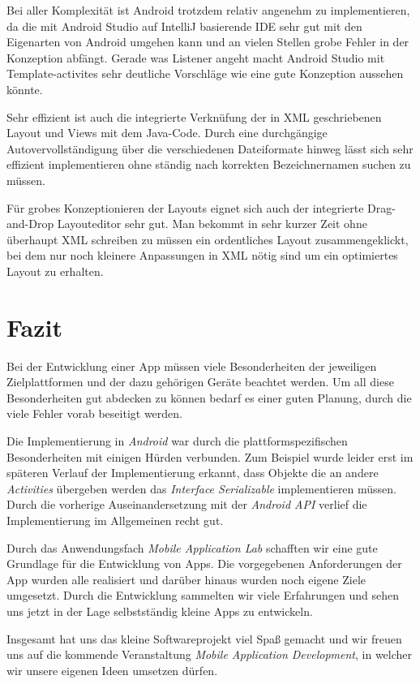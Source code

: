 Bei aller Komplexität ist Android trotzdem relativ angenehm zu implementieren, da die mit Android Studio auf IntelliJ basierende IDE sehr gut mit den Eigenarten von Android umgehen kann und an vielen Stellen grobe Fehler in der Konzeption abfängt. Gerade was Listener angeht macht Android Studio mit  Template-activites sehr deutliche Vorschläge wie eine gute Konzeption aussehen könnte. 

Sehr effizient ist auch die integrierte Verknüfung der in XML geschriebenen Layout und Views mit dem Java-Code. Durch eine durchgängige Autovervollständigung über die verschiedenen Dateiformate hinweg lässt sich sehr effizient implementieren ohne ständig nach korrekten Bezeichnernamen suchen zu müssen.

Für grobes Konzeptionieren der Layouts eignet sich auch der integrierte Drag-and-Drop Layouteditor sehr gut. Man bekommt in sehr kurzer Zeit ohne überhaupt XML schreiben zu müssen ein ordentliches Layout zusammengeklickt, bei dem nur noch kleinere Anpassungen in XML nötig sind um ein optimiertes Layout zu erhalten.

\section{Fazit}
\label{cha:fazit}

Bei der Entwicklung einer App müssen viele Besonderheiten der jeweiligen Zielplattformen und der dazu gehörigen Geräte beachtet werden. Um all diese Besonderheiten gut abdecken zu können bedarf es einer guten Planung, durch die viele Fehler vorab beseitigt werden.

Die Implementierung in \textit{Android} war durch die plattformspezifischen Besonderheiten mit einigen Hürden verbunden. Zum Beispiel wurde leider erst im späteren Verlauf der Implementierung erkannt, dass Objekte die an andere \textit{Activities} übergeben werden das \textit{Interface Serializable} implementieren müssen. Durch die vorherige Auseinandersetzung mit der \textit{Android API} verlief die Implementierung im Allgemeinen recht gut.

Durch das Anwendungsfach \textit{Mobile Application Lab} schafften wir eine gute Grundlage für die Entwicklung von Apps. Die vorgegebenen Anforderungen der App wurden alle realisiert und darüber hinaus wurden noch eigene Ziele umgesetzt. Durch die Entwicklung sammelten wir viele Erfahrungen und sehen uns jetzt in der Lage selbstständig kleine Apps zu entwickeln.

Insgesamt hat uns das kleine Softwareprojekt viel Spaß gemacht und wir freuen uns auf die kommende Veranstaltung \textit{Mobile Application Development}, in welcher wir unsere eigenen Ideen umsetzen dürfen.


